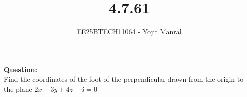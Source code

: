 \documentclass[journal]{IEEEtran}
\begin{document}

\vspace{3cm}

\title{4.7.61}
\author{EE25BTECH11064 - Yojit Manral}

\maketitle
{\let\newpage\relax\maketitle}
\renewcommand{\thefigure}{\theenumi}
\renewcommand{\thetable}{\theenumi}
\setlength{\intextsep}{10pt} %

\textbf{Question:}\\
Find the coordinates of the foot of the perpendicular drawn from the origin to the plane $2x - 3y + 4z - 6 = 0$
\end{document}
